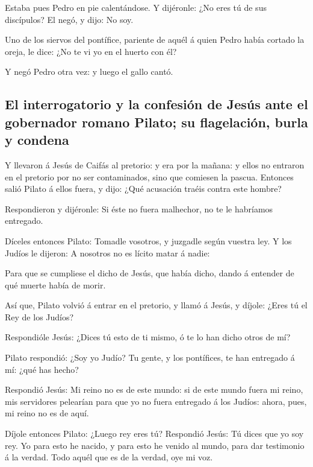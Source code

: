  Estaba pues Pedro en pie calentándose. Y dijéronle: ¿No
eres tú de sus discípulos? El negó, y dijo: No soy.

 Uno de los siervos del pontífice, pariente de aquél á
quien Pedro había cortado la oreja, le dice: ¿No te vi yo en el huerto
con él?

 Y negó Pedro otra vez: y luego el gallo cantó.

\hypertarget{el-interrogatorio-y-la-confesiuxf3n-de-jesuxfas-ante-el-gobernador-romano-pilato-su-flagelaciuxf3n-burla-y-condena}{%
\subsection{El interrogatorio y la confesión de Jesús ante el gobernador
romano Pilato; su flagelación, burla y
condena}\label{el-interrogatorio-y-la-confesiuxf3n-de-jesuxfas-ante-el-gobernador-romano-pilato-su-flagelaciuxf3n-burla-y-condena}}

 Y llevaron á Jesús de Caifás al pretorio: y era por la
mañana: y ellos no entraron en el pretorio por no ser contaminados, sino
que comiesen la pascua.  Entonces salió Pilato á ellos
fuera, y dijo: ¿Qué acusación traéis contra este hombre?

 Respondieron y dijéronle: Si éste no fuera malhechor, no
te le habríamos entregado.

 Díceles entonces Pilato: Tomadle vosotros, y juzgadle
según vuestra ley. Y los Judíos le dijeron: A nosotros no es lícito
matar á nadie:

 Para que se cumpliese el dicho de Jesús, que había
dicho, dando á entender de qué muerte había de morir.

 Así que, Pilato volvió á entrar en el pretorio, y llamó
á Jesús, y díjole: ¿Eres tú el Rey de los Judíos?

 Respondióle Jesús: ¿Dices tú esto de ti mismo, ó te lo
han dicho otros de mí?

 Pilato respondió: ¿Soy yo Judío? Tu gente, y los
pontífices, te han entregado á mí: ¿qué has hecho?

 Respondió Jesús: Mi reino no es de este mundo: si de
este mundo fuera mi reino, mis servidores pelearían para que yo no fuera
entregado á los Judíos: ahora, pues, mi reino no es de aquí.

 Díjole entonces Pilato: ¿Luego rey eres tú? Respondió
Jesús: Tú dices que yo soy rey. Yo para esto he nacido, y para esto he
venido al mundo, para dar testimonio á la verdad. Todo aquél que es de
la verdad, oye mi voz.


